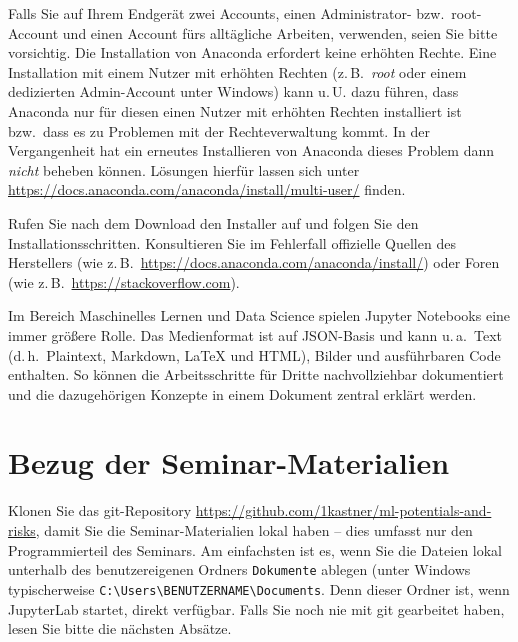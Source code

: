 \documentclass{tufte-handout}
\begin{document}
Falls Sie auf Ihrem Endgerät zwei Accounts, einen Administrator- bzw.\ root-Account und einen Account fürs alltägliche Arbeiten, verwenden, seien Sie bitte vorsichtig.
Die Installation von Anaconda erfordert keine erhöhten Rechte.
Eine Installation mit einem Nutzer mit erhöhten Rechten (z.\,B.\ \emph{root} oder einem dedizierten Admin-Account unter Windows) kann u.\,U. dazu führen, dass Anaconda nur für diesen einen Nutzer mit erhöhten Rechten installiert ist bzw.\ dass es zu Problemen mit der Rechteverwaltung kommt.
In der Vergangenheit hat ein erneutes Installieren von Anaconda dieses Problem dann \emph{nicht} beheben können.
Lösungen hierfür lassen sich unter \url{https://docs.anaconda.com/anaconda/install/multi-user/} finden. 

Rufen Sie nach dem Download den Installer auf und folgen Sie den Installationsschritten.
Konsultieren Sie im Fehlerfall offizielle Quellen des Herstellers (wie z.\,B.\ \url{https://docs.anaconda.com/anaconda/install/})
oder Foren (wie z.\,B.\ \url{https://stackoverflow.com}).


Im Bereich Maschinelles Lernen und Data Science spielen Jupyter Notebooks eine immer größere Rolle.
Das Medienformat ist auf JSON-Basis und kann u.\,a.\
Text (d.\,h.\ Plaintext, Markdown, LaTeX und HTML),
Bilder und
ausführbaren Code enthalten.
So können die Arbeitsschritte für Dritte nachvollziehbar dokumentiert und die dazugehörigen Konzepte in einem Dokument zentral erklärt werden.


\section{Bezug der Seminar-Materialien}
\label{sec:git-clone}

Klonen Sie das git-Repository
\url{https://github.com/1kastner/ml-potentials-and-risks},
damit Sie die Seminar-Materialien lokal haben -- dies umfasst nur den Programmierteil des Seminars.
Am einfachsten ist es, wenn Sie die Dateien lokal unterhalb des benutzer\-eigenen Ordners \texttt{Dokumente} ablegen
(unter Windows typischerweise \texttt{C:\textbackslash{}Users\textbackslash{}BENUTZERNAME\textbackslash{}Documents}.
Denn dieser Ordner ist, wenn JupyterLab startet, direkt verfügbar.
Falls Sie noch nie mit git gearbeitet haben, lesen Sie bitte die nächsten Absätze.
\end{document}

